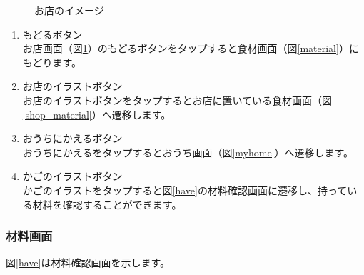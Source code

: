 \documentclass[a4j]{jarticle}
\begin{document}
\begin{figure}[H]
    \begin{center}
    \caption {お店のイメージ}
    \label{shop}
    \end{center}
\end{figure}

\begin{enumerate}
  \renewcommand{\labelenumi}{\textcircled{\scriptsize \theenumi}}
\item もどるボタン\\
  お店画面（図\ref{shop}）のもどるボタンをタップすると食材画面（図\ref{material}）にもどります。
\item お店のイラストボタン\\
  お店のイラストボタンをタップするとお店に置いている食材画面（図\ref{shop_material}）へ遷移します。
\item おうちにかえるボタン\\
  おうちにかえるをタップするとおうち画面（図\ref{myhome}）へ遷移します。
\item かごのイラストボタン\\
  かごのイラストをタップすると図\ref{have}の材料確認画面に遷移し、持っている材料を確認することができます。
\end{enumerate}

\newpage
\subsubsection{材料画面}
図\ref{have}は材料確認画面を示します。\\
\end{document}
